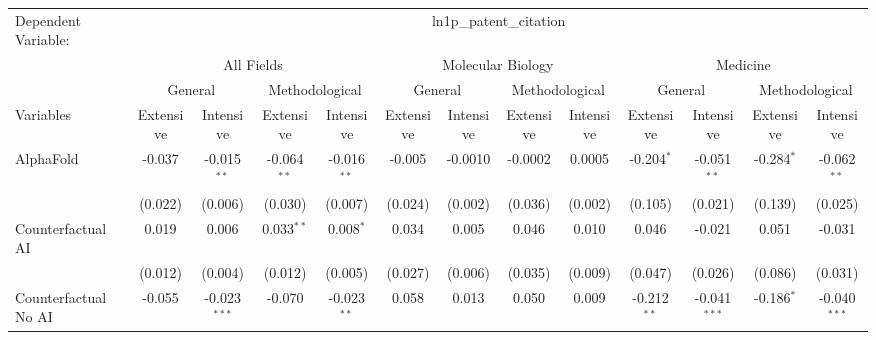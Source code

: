 \begingroup
\centering
\begin{tabular}{lcccccccccccc}
   \tabularnewline \midrule \midrule
   Dependent Variable: & \multicolumn{12}{c}{ln1p\_patent\_citation}\\
 & \multicolumn{4}{c}{All Fields} & \multicolumn{4}{c}{Molecular Biology} & \multicolumn{4}{c}{Medicine} \\
\cmidrule(lr){2-5} \cmidrule(lr){6-9} \cmidrule(lr){10-13}
 & \multicolumn{2}{c}{General} & \multicolumn{2}{c}{Methodological} & \multicolumn{2}{c}{General} & \multicolumn{2}{c}{Methodological} & \multicolumn{2}{c}{General} & \multicolumn{2}{c}{Methodological} \\
\cmidrule(lr){2-3} \cmidrule(lr){4-5} \cmidrule(lr){6-7} \cmidrule(lr){8-9} \cmidrule(lr){10-11} \cmidrule(lr){12-13}
Variables & \multicolumn{1}{c}{Extensive} & \multicolumn{1}{c}{Intensive} & \multicolumn{1}{c}{Extensive} & \multicolumn{1}{c}{Intensive} & \multicolumn{1}{c}{Extensive} & \multicolumn{1}{c}{Intensive} & \multicolumn{1}{c}{Extensive} & \multicolumn{1}{c}{Intensive} & \multicolumn{1}{c}{Extensive} & \multicolumn{1}{c}{Intensive} & \multicolumn{1}{c}{Extensive} & \multicolumn{1}{c}{Intensive} \\
\cmidrule(lr){1-1}\cmidrule(lr){2-2} \cmidrule(lr){3-3} \cmidrule(lr){4-4} \cmidrule(lr){5-5} \cmidrule(lr){6-6} \cmidrule(lr){7-7} \cmidrule(lr){8-8} \cmidrule(lr){9-9} \cmidrule(lr){10-10} \cmidrule(lr){11-11} \cmidrule(lr){12-12} \cmidrule(lr){13-13}
   AlphaFold                                & -0.037       & -0.015$^{**}$  & -0.064$^{**}$ & -0.016$^{**}$ & -0.005  & -0.0010  & -0.0002 & 0.0005   & -0.204$^{*}$  & -0.051$^{**}$  & -0.284$^{*}$ & -0.062$^{**}$\\   
                                            & (0.022)      & (0.006)        & (0.030)       & (0.007)       & (0.024) & (0.002)  & (0.036) & (0.002)  & (0.105)       & (0.021)        & (0.139)      & (0.025)\\   
   Counterfactual AI                        & 0.019        & 0.006          & 0.033$^{**}$  & 0.008$^{*}$   & 0.034   & 0.005    & 0.046   & 0.010    & 0.046         & -0.021         & 0.051        & -0.031\\   
                                            & (0.012)      & (0.004)        & (0.012)       & (0.005)       & (0.027) & (0.006)  & (0.035) & (0.009)  & (0.047)       & (0.026)        & (0.086)      & (0.031)\\   
   Counterfactual No AI                     & -0.055       & -0.023$^{***}$ & -0.070        & -0.023$^{**}$ & 0.058   & 0.013    & 0.050   & 0.009    & -0.212$^{**}$ & -0.041$^{***}$ & -0.186$^{*}$ & -0.040$^{***}$\\   

\end{tabular}
